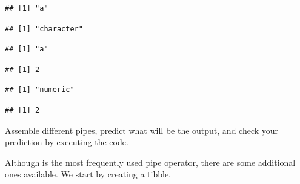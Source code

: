 \documentclass[krantz2]{krantz}\usepackage{knitr}%
\begin{document}
\begin{explainbox}
\begin{knitrout}\footnotesize
{}\color{fgcolor}\begin{kframe}
\begin{alltt}
 \hlkwb{<-} \hlstd{(}\hlstd{)}
\end{alltt}
\begin{verbatim}
## [1] "a"
\end{verbatim}
\begin{alltt}
\end{alltt}
\begin{verbatim}
## [1] "character"
\end{verbatim}
\begin{alltt}
\end{alltt}
\begin{verbatim}
## [1] "a"
\end{verbatim}
\begin{alltt}
 \hlkwb{<-} \hlstd{(}\hlstd{)}
\end{alltt}
\begin{verbatim}
## [1] 2
\end{verbatim}
\begin{alltt}
\end{alltt}
\begin{verbatim}
## [1] "numeric"
\end{verbatim}
\begin{alltt}
\end{alltt}
\begin{verbatim}
## [1] 2
\end{verbatim}
\end{kframe}
\end{knitrout}

\end{explainbox}

\begin{playground}
Assemble different pipes, predict what will be the output, and check your prediction by executing the code.
\end{playground}

Although \Roperator{\%>\%} is the most frequently used pipe operator, there are some additional ones available. We start by creating a tibble.

\begin{knitrout}\footnotesize
{}\color{fgcolor}\begin{kframe}
\begin{alltt}
 \hlkwb{<-} \hlstd{(} \hlstd{=} \hlopt{:}\hlstd{,}  \hlstd{=} \hlstd{(letters[}\hlopt{:}\hlstd{],} \hlstd{))}
\end{alltt}
\end{kframe}
\end{knitrout}
\end{document}
